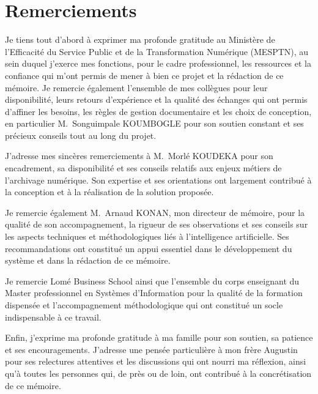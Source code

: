 \documentclass[12pt,a4paper]{report}
\title{\rapportTitre}
\author{\parbox{0.95\textwidth}{\centering
  \auteurNom\\
  \diplome\\
  \directeurNom\\
  \structureAccueil\\
  \tuteurStage
}}
\date{2026}
\begin{document}
\newcommand{\versionPageGarde}{2}


\setcounter{page}{1}

\chapter*{Remerciements}
\begingroup
{}
\setlength{\parskip}{0.45em}
\vspace{-0.6em}
Je tiens tout d'abord à exprimer ma profonde gratitude au Ministère de l'Efficacité du Service Public et de la Transformation Numérique (MESPTN), au sein duquel j'exerce mes fonctions, pour le cadre professionnel, les ressources et la confiance qui m'ont permis de mener à bien ce projet et la rédaction de ce mémoire. Je remercie également l'ensemble de mes collègues pour leur disponibilité, leurs retours d'expérience et la qualité des échanges qui ont permis d'affiner les besoins, les règles de gestion documentaire et les choix de conception, en particulier M.~Songuimpale KOUMBOGLE pour son soutien constant et ses précieux conseils tout au long du projet.

J'adresse mes sincères remerciements à M.~Morlé KOUDEKA pour son encadrement, sa disponibilité et ses conseils relatifs aux enjeux métiers de l'archivage numérique. Son expertise et ses orientations ont largement contribué à la conception et à la réalisation de la solution proposée.

Je remercie également M.~Arnaud KONAN, mon directeur de mémoire, pour la qualité de son accompagnement, la rigueur de ses observations et ses conseils sur les aspects techniques et méthodologiques liés à l'intelligence artificielle. Ses recommandations ont constitué un appui essentiel dans le développement du système et dans la rédaction de ce mémoire.

Je remercie Lomé Business School ainsi que l'ensemble du corps enseignant du Master professionnel en Systèmes d'Information pour la qualité de la formation dispensée et l'accompagnement méthodologique qui ont constitué un socle indispensable à ce travail.

Enfin, j'exprime ma profonde gratitude à ma famille pour son soutien, sa patience et ses encouragements. J'adresse une pensée particulière à mon frère Augustin pour ses relectures attentives et les discussions qui ont nourri ma réflexion, ainsi qu'à toutes les personnes qui, de près ou de loin, ont contribué à la concrétisation de ce mémoire.
\endgroup
\end{document}
